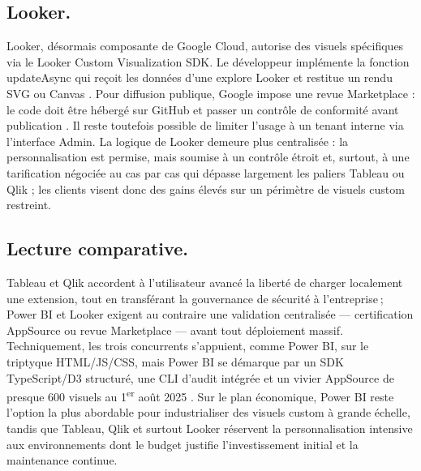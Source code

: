 \subsection{Looker.}  
Looker, désormais composante de Google Cloud, autorise des visuels
spécifiques via le Looker Custom Visualization SDK. Le développeur
implémente la fonction updateAsync qui reçoit les données
d’une explore Looker et restitue un rendu SVG ou Canvas
\parencite{LookerVizSDK2025}. Pour diffusion publique, Google impose une
revue Marketplace : le code doit être hébergé sur GitHub et passer un
contrôle de conformité avant publication
\parencite{LookerMarketplace2024}. Il reste toutefois possible de limiter
l’usage à un tenant interne via l’interface Admin. La logique de Looker
demeure plus centralisée : la personnalisation est permise, mais soumise à
un contrôle étroit et, surtout, à une tarification négociée au cas par cas
qui dépasse largement les paliers Tableau ou Qlik ; les clients visent
donc des gains élevés sur un périmètre de visuels custom restreint.

\subsection{Lecture comparative.}  
Tableau et Qlik accordent à l’utilisateur avancé la liberté de charger
localement une extension, tout en transférant la gouvernance de sécurité à
l’entreprise ; Power BI et Looker exigent au contraire une validation
centralisée — certification AppSource ou revue Marketplace — avant tout
déploiement massif. Techniquement, les trois concurrents s’appuient, comme
Power BI, sur le triptyque HTML/JS/CSS, mais Power BI se démarque par un
SDK TypeScript/D3 structuré, une CLI d’audit intégrée et un vivier
AppSource de presque 600 visuels au 1\textsuperscript{er}
août 2025 \parencite{AppSourceCount2025}. Sur le plan économique, Power BI
reste l’option la plus abordable pour industrialiser des visuels custom à
grande échelle, tandis que Tableau, Qlik et surtout Looker réservent la
personnalisation intensive aux environnements dont le budget justifie
l’investissement initial et la maintenance continue.
